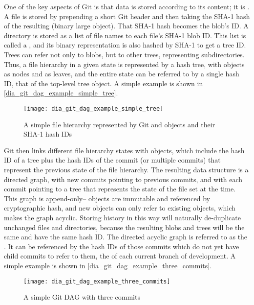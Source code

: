 One of the key aspects of Git is that data is stored according to its content;
it is . A file is stored by prepending a short Git
header and then taking the SHA-1 hash of the resulting  (binary
large object). That SHA-1 hash becomes the blob's ID. A directory is stored as a
list of file names to each file's SHA-1 blob ID. This list is called a
, and its binary representation is also hashed by SHA-1 to get a
tree ID. Trees can refer not only to blobs, but to other trees, representing
subdirectories. Thus, a file hierarchy in a given state is represented by a hash
tree, with  objects as nodes and  as leaves, and
the entire state can be referred to by a single hash ID, that of the top-level
tree object. A simple example is shown in
\autoref{dia_git_dag_example_simple_tree}.

\begin{figure}[h]
    \centering
    \texttt{[image: dia\_git\_dag\_example\_simple\_tree]}
    \caption{A simple file hierarchy represented by Git  and
         objects and their SHA-1 hash IDs}
    \label{dia_git_dag_example_simple_tree}
\end{figure}

Git then links different file hierarchy states with  objects,
which include the hash ID of a tree plus the hash IDs of the commit (or multiple
commits) that represent the previous state of the file hierarchy. The resulting
data structure is a directed graph, with new commits pointing to previous
commits, and with each commit pointing to a tree that represents the state of
the file set at the time. This graph is append-only-- objects are immutable and
referenced by cryptographic hash, and new objects can only refer to existing
objects, which makes the graph acyclic. Storing history in this way will
naturally de-duplicate unchanged files and directories, because the resulting
blobs and trees will be the same and have the same hash ID. The directed acyclic
graph is referred to as the . It can be referenced by the hash IDs
of those commits which do not yet have child commits to refer to them, the
 of each current branch of development. A simple example is shown
in \autoref{dia_git_dag_example_three_commits}.

\begin{figure}[h]
    \centering
    \texttt{[image: dia\_git\_dag\_example\_three\_commits]}
    \caption{A simple Git DAG with three commits}
    \label{dia_git_dag_example_three_commits}
\end{figure}

